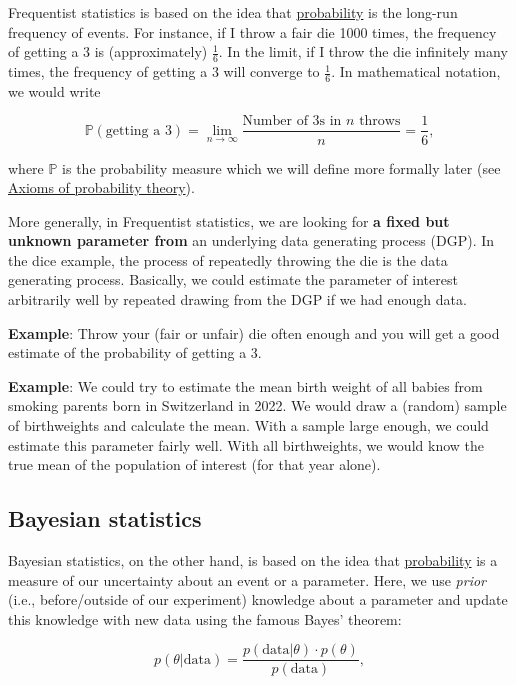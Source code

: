 \documentclass[
]{book}
\begin{document}
Frequentist statistics is based on the idea that \href{https://en.wikipedia.org/wiki/Frequentist_probability}{probability} is the long-run
frequency of events. For instance, if I throw a fair die 1000 times, the frequency of getting a 3 is (approximately) \(\frac{1}{6}\). In the limit,
if I throw the die infinitely many times, the frequency of getting a 3 will converge to \(\frac{1}{6}\). In mathematical notation, we would write

\[
\mathbb{P}(\text{getting a 3}) = \lim_{n \to \infty} \frac{\text{Number of 3s in } n \text{ throws}}{n} = \frac{1}{6},
\]

where \(\mathbb{P}\) is the probability measure which we will define more formally later (see \hyperref[axioms_of_probability_theory]{Axioms of probability theory}).

More generally, in Frequentist statistics, we are looking for \textbf{a fixed but unknown parameter from} an underlying data generating process (DGP).
In the dice example, the process of repeatedly throwing the die is the data generating process.
Basically, we could estimate the parameter of interest arbitrarily well by repeated drawing from the DGP if we had enough data.

\textbf{Example}: Throw your (fair or unfair) die often enough and you will get a good estimate of the probability of getting a 3.

\textbf{Example}: We could try to estimate the mean birth weight of all babies from smoking parents born in Switzerland in 2022.
We would draw a (random) sample of birthweights and calculate the mean. With a sample large enough, we could estimate this parameter fairly well.
With all birthweights, we would know the true mean of the population of interest (for that year alone).

\subsection{Bayesian statistics}\label{bayesian-statistics}

Bayesian statistics, on the other hand, is based on the idea that \href{https://en.wikipedia.org/wiki/Bayesian_probability}{probability} is a measure of our uncertainty about an event or a parameter.
Here, we use \emph{prior} (i.e., before/outside of our experiment) knowledge about a parameter and update this knowledge with new data using the famous Bayes' theorem:

\[
p(\theta | \text{data}) = \frac{p(\text{data} | \theta) \cdot p(\theta)}{p(\text{data})},
\]
\end{document}
